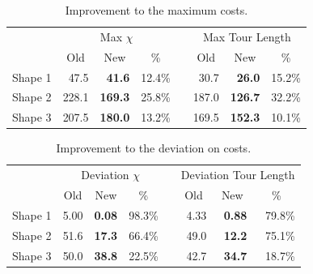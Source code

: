 \documentclass[../main.tex]{subfiles}
\begin{document}
\begin{table}
	\centering
	\caption{Improvement to the maximum costs.}
	\label{table:decomposition_improvement_max}
	\begin{tabular}{@{}l rrrrrrr}
		\toprule
		& \multicolumn{3}{c}{Max $\chi$} && \multicolumn{3}{c}{Max Tour Length} \\
		\cmidrule{2-4} \cmidrule{6-8}
		& \multicolumn{1}{c}{Old} & \multicolumn{1}{c}{New} & \multicolumn{1}{c}{\%} & & \multicolumn{1}{c}{Old} & \multicolumn{1}{c}{New} & \multicolumn{1}{c}{\%}  \\
		\cmidrule{1-8}
		Shape 1 & 47.5 & \bf{41.6}   & 12.4\% && 30.7 & \bf{26.0}   & 15.2\% \\
		Shape 2 & 228.1 & \bf{169.3} & 25.8\% && 187.0 & \bf{126.7} & 32.2\% \\
		Shape 3 & 207.5 & \bf{180.0} & 13.2\% && 169.5 & \bf{152.3} & 10.1\% \\
		\bottomrule

	\end{tabular}
\end{table}

\begin{table}
	\centering
	\caption{Improvement to the deviation on costs.}
	\label{table:decomposition_improvement_deviation}
	\begin{tabular}{@{}l rrrrrrr}
		\toprule
		& \multicolumn{3}{c}{Deviation $\chi$} && \multicolumn{3}{c}{Deviation Tour Length} \\
		\cmidrule{2-4} \cmidrule{6-8}
		& \multicolumn{1}{c}{Old} & \multicolumn{1}{c}{New} & \multicolumn{1}{c}{\%} & & \multicolumn{1}{c}{Old} & \multicolumn{1}{c}{New} & \multicolumn{1}{c}{\%}  \\
		\cmidrule{1-8}
		Shape 1 & 5.00 & \bf{0.08} & 98.3\% && 4.33 & \bf{0.88} & 79.8\% \\
		Shape 2 & 51.6 & \bf{17.3} & 66.4\% && 49.0 & \bf{12.2} & 75.1\% \\
		Shape 3 & 50.0 & \bf{38.8} & 22.5\% && 42.7 & \bf{34.7} & 18.7\% \\
		\bottomrule

	\end{tabular}
\end{table}
\end{document}
